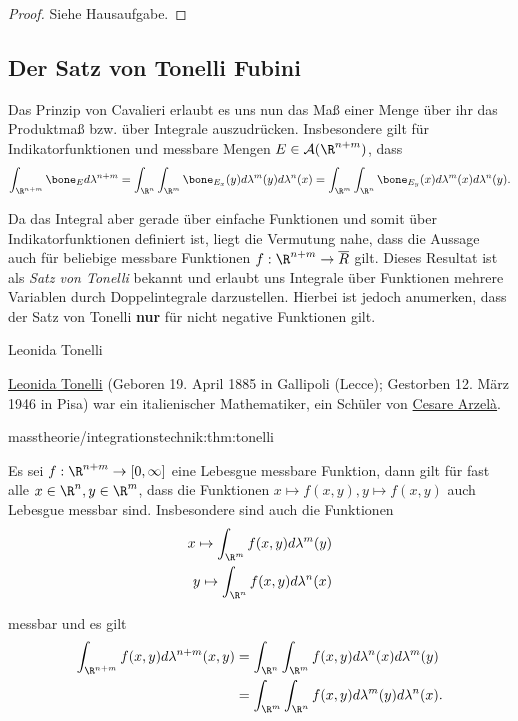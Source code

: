 \documentclass[letterpaper,10pt,german]{jupyterBook}
\begin{document}
\begin{proof}
 Siehe Hausaufgabe.
\end{proof}


\subsection{Der Satz von Tonelli Fubini}
\label{\detokenize{masstheorie/integrationstechnik:der-satz-von-tonelli-fubini}}
\par
Das Prinzip von Cavalieri erlaubt es uns nun das Maß einer Menge über ihr das Produktmaß bzw. über Integrale auszudrücken. Insbesondere gilt für Indikatorfunktionen und messbare Mengen \(E\in\mathcal{A}(\R^{n+m})\), dass
\begin{align*}
\int_{\R^{n+m}} \bone_E d\lambda^{n+m} = \int_{\R^{n}} \int_{\R^{m}} \bone_{E_x}(y) d\lambda^m(y)d\lambda^n(x) =
\int_{\R^{m}} \int_{\R^{n}} \bone_{E_y}(x) d\lambda^m(x)d\lambda^n(y).
\end{align*}
\par
Da das Integral aber gerade über einfache Funktionen und somit über Indikatorfunktionen definiert ist, liegt die Vermutung nahe, dass die Aussage auch für beliebige messbare Funktionen \(f:\R^{n+m}\to\overline{R}\) gilt. Dieses Resultat ist als \emph{Satz von Tonelli} bekannt und erlaubt uns Integrale über Funktionen mehrere Variablen durch Doppelintegrale darzustellen. Hierbei ist jedoch anumerken, dass der Satz von Tonelli \textbf{nur} für nicht negative Funktionen gilt.

\begin{emphBox}{Leonida Tonelli}{}

\par
\href{https://de.wikipedia.org/wiki/Leonida\_Tonelli}{Leonida Tonelli} (Geboren 19. April 1885 in Gallipoli (Lecce); Gestorben 12. März 1946 in Pisa) war ein italienischer Mathematiker, ein Schüler von \href{https://de.wikipedia.org/wiki/Cesare\_Arzel\%C3\%A0}{Cesare Arzelà}.
\end{emphBox}
\begin{theorem}{}{masstheorie/integrationstechnik:thm:tonelli}



\par
Es sei \(f:\R^{n+m}\to [0,\infty]\) eine Lebesgue messbare Funktion, dann gilt für fast alle \(x\in\R^n,y\in\R^m\), dass die Funktionen \(x\mapsto f(x,y), y\mapsto f(x,y)\) auch Lebesgue messbar sind. Insbesondere sind auch die Funktionen
\begin{align*}
x \mapsto \int_{\R^m} f(x,y) d\lambda^m(y)\\
y \mapsto \int_{\R^n} f(x,y) d\lambda^n(x)
\end{align*}
\par
messbar und es gilt
\begin{align*}
\int_{\R^{n+m}} f(x,y) d\lambda^{n+m}(x,y) &= \int_{\R^n}\int_{\R^m} f(x,y) d\lambda^{n}(x)d\lambda^m(y)\\
&=
\int_{\R^m}\int_{\R^n} f(x,y) d\lambda^{m}(y)d\lambda^n(x).
\end{align*}\end{theorem}
\end{document}
